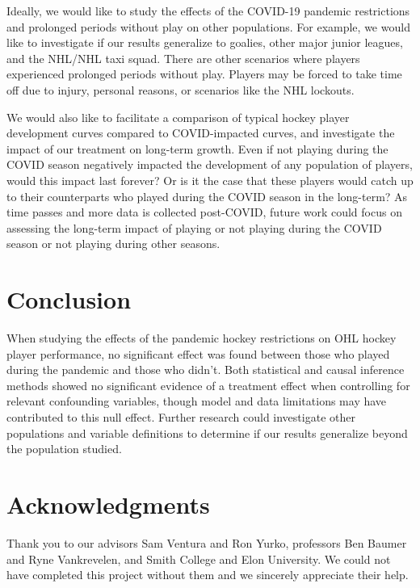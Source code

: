 \documentclass[12pt]{article}
\begin{document}
Ideally, we would like to study the effects of the COVID-19 pandemic
restrictions and prolonged periods without play on other populations.
For example, we would like to investigate if our results generalize to
goalies, other major junior leagues, and the NHL/NHL taxi squad. There
are other scenarios where players experienced prolonged periods without
play. Players may be forced to take time off due to injury, personal
reasons, or scenarios like the NHL lockouts.

We would also like to facilitate a comparison of typical hockey player
development curves compared to COVID-impacted curves, and investigate
the impact of our treatment on long-term growth. Even if not playing
during the COVID season negatively impacted the development of any
population of players, would this impact last forever? Or is it the case
that these players would catch up to their counterparts who played
during the COVID season in the long-term? As time passes and more data
is collected post-COVID, future work could focus on assessing the
long-term impact of playing or not playing during the COVID season or
not playing during other seasons.

\hypertarget{conclusion}{%
\section{Conclusion}\label{conclusion}}

When studying the effects of the pandemic hockey restrictions on OHL
hockey player performance, no significant effect was found between those
who played during the pandemic and those who didn't. Both statistical
and causal inference methods showed no significant evidence of a
treatment effect when controlling for relevant confounding variables,
though model and data limitations may have contributed to this null
effect. Further research could investigate other populations and
variable definitions to determine if our results generalize beyond the
population studied.

\hypertarget{acknowledgments}{%
\section{Acknowledgments}\label{acknowledgments}}

Thank you to our advisors Sam Ventura and Ron Yurko, professors Ben
Baumer and Ryne Vankrevelen, and Smith College and Elon University. We
could not have completed this project without them and we sincerely
appreciate their help.

\pagebreak



\end{document}
